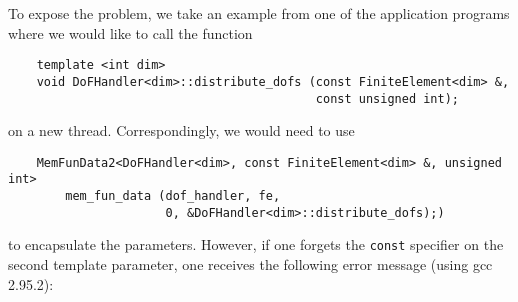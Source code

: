 \documentclass[11pt]{article}
\begin{document}
To expose the problem, we take an example from one of the application programs
where we would like to call the function
\begin{verbatim}
    template <int dim>
    void DoFHandler<dim>::distribute_dofs (const FiniteElement<dim> &,
                                           const unsigned int);
\end{verbatim}
on a new thread. Correspondingly, we would need to use
\begin{verbatim}
    MemFunData2<DoFHandler<dim>, const FiniteElement<dim> &, unsigned int>
        mem_fun_data (dof_handler, fe,
                      0, &DoFHandler<dim>::distribute_dofs);)
\end{verbatim}
to encapsulate the parameters. However, if one forgets the \texttt{const}
specifier on the second template parameter, one receives the following error
message (using gcc 2.95.2):
\end{document}
